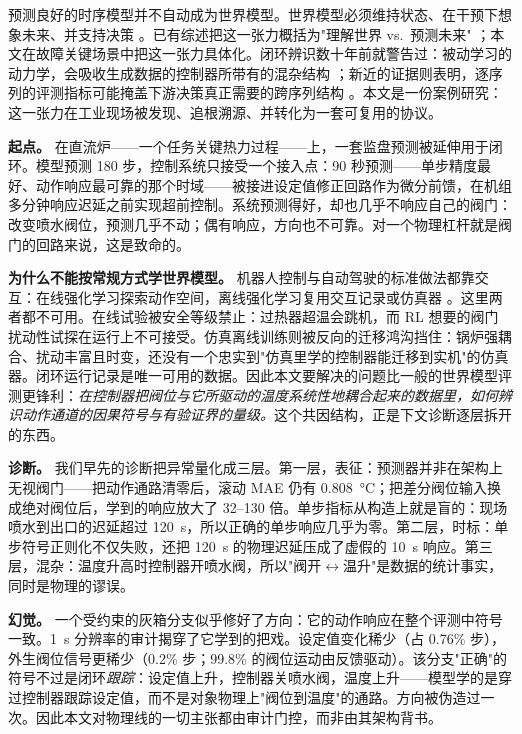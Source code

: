 \documentclass[11pt]{article}
\begin{document}
预测良好的时序模型并不自动成为世界模型。世界模型必须维持状态、在干预下想象未来、并支持决策 \cite{ha2018world,hafner2023dreamerv3}。已有综述把这一张力概括为"理解世界 vs.\ 预测未来" \cite{ding2024understanding}；本文在故障关键场景中把这一张力具体化。闭环辨识数十年前就警告过：被动学习的动力学，会吸收生成数据的控制器所带有的混杂结构 \cite{forssell1999closedloop}；新近的证据则表明，逐序列的评测指标可能掩盖下游决策真正需要的跨序列结构 \cite{wan2026forecast}。本文是一份案例研究：这一张力在工业现场被发现、追根溯源、并转化为一套可复用的协议。

\textbf{起点。} 在直流炉——一个任务关键热力过程——上，一套监盘预测被延伸用于闭环。模型预测 180 步，控制系统只接受一个接入点：90 秒预测——单步精度最好、动作响应最可靠的那个时域——被接进设定值修正回路作为微分前馈，在机组多分钟响应迟延之前实现超前控制。系统预测得好，却也几乎不响应自己的阀门：改变喷水阀位，预测几乎不动；偶有响应，方向也不可靠。对一个物理杠杆就是阀门的回路来说，这是致命的。

\textbf{为什么不能按常规方式学世界模型。} 机器人控制与自动驾驶的标准做法都靠交互：在线强化学习探索动作空间，离线强化学习复用交互记录或仿真器 \cite{hafner2023dreamerv3}。这里两者都不可用。在线试验被安全等级禁止：过热器超温会跳机，而 RL 想要的阀门扰动性试探在运行上不可接受。仿真离线训练则被反向的迁移鸿沟挡住：锅炉强耦合、扰动丰富且时变，还没有一个忠实到"仿真里学的控制器能迁移到实机"的仿真器。闭环运行记录是唯一可用的数据。因此本文要解决的问题比一般的世界模型评测更锋利：\emph{在控制器把阀位与它所驱动的温度系统性地耦合起来的数据里，如何辨识动作通道的因果符号与有验证界的量级。}这个共因结构，正是下文诊断逐层拆开的东西。

\textbf{诊断。} 我们早先的诊断把异常量化成三层。第一层，表征：预测器并非在架构上无视阀门——把动作通路清零后，滚动 MAE 仍有 0.808~\si{\degreeCelsius}；把差分阀位输入换成绝对阀位后，学到的响应放大了 32--130 倍。单步指标从构造上就是盲的：现场喷水到出口的迟延超过 120~s，所以正确的单步响应几乎为零。第二层，时标：单步符号正则化不仅失败，还把 120~s 的物理迟延压成了虚假的 10~s 响应。第三层，混杂：温度升高时控制器开喷水阀，所以"阀开$\leftrightarrow$温升"是数据的统计事实，同时是物理的谬误。

\textbf{幻觉。} 一个受约束的灰箱分支似乎修好了方向：它的动作响应在整个评测中符号一致。1~s 分辨率的审计揭穿了它学到的把戏。设定值变化稀少（占 0.76\% 步），外生阀位信号更稀少（0.2\% 步；99.8\% 的阀位运动由反馈驱动）。该分支"正确"的符号不过是闭环\emph{跟踪}：设定值上升，控制器关喷水阀，温度上升——模型学的是穿过控制器跟踪设定值，而不是对象物理上"阀位到温度"的通路。方向被伪造过一次。因此本文对物理线的一切主张都由审计门控，而非由其架构背书。
\end{document}
